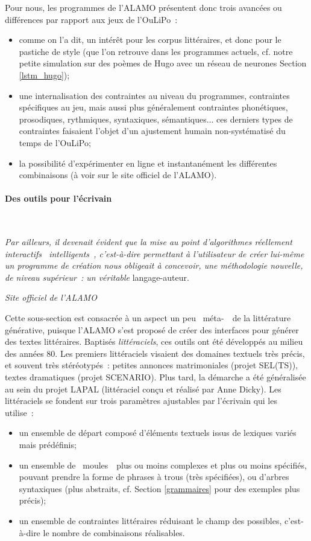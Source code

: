 \documentclass{article}
\newcommand{\subsubsubsection}[1]{\paragraph{#1}\mbox{}\\}
\newenvironment{citationbox}
{\begin{center}
		\begin{minipage}{.8\textwidth}
		}
		{
		\end{minipage}	
\end{center}
}
\begin{document}
					Pour nous, les programmes de l'ALAMO présentent donc trois avancées ou différences par rapport aux jeux de l'OuLiPo~:
					\vspace{2mm}
					\begin{itemize}
						\item comme on l'a dit, un intérêt pour les corpus littéraires, et donc pour le pastiche de style (que l'on retrouve dans les programmes actuels, cf. notre petite simulation sur des poèmes de Hugo avec un réseau de neurones Section \ref{lstm_hugo});
						\item une internalisation des contraintes au niveau du programmes, contraintes spécifiques au jeu, mais aussi plus généralement contraintes phonétiques, prosodiques, rythmiques, syntaxiques, sémantiques... ces derniers types de contraintes faisaient l'objet d'un ajustement humain non-systématisé du temps de l'OuLiPo;
						\item la possibilité d'expérimenter en ligne et instantanément les différentes combinaisons (à voir sur le site officiel de l'ALAMO).
					\end{itemize}
				\subsubsubsection{Des outils pour l'écrivain}
					\begin{citationbox}
						\textit{Par ailleurs, il devenait évident que la mise au point d'algorithmes réellement interactifs \guillemotleft~intelligents~\guillemotright, c’est-à-dire permettant à l’utilisateur de créer lui-même un programme de création nous obligeait à concevoir, une méthodologie nouvelle, de niveau supérieur~: un véritable} langage-auteur.
						\begin{flushright}
							\textit{Site officiel de l'ALAMO} \autocite{alamo}
						\end{flushright}
					\end{citationbox}
					Cette sous-section est consacrée à un aspect un peu \guillemotleft~méta-~\guillemotright~de la littérature générative, puisque l'ALAMO s'est proposé de créer des interfaces pour générer des textes littéraires. Baptisés \textit{littéraciels}, ces outils ont été développés au milieu des années 80. Les premiers littéraciels visaient des domaines textuels très précis, et souvent très stéréotypés~: petites annonces matrimoniales (projet SEL(TS)), textes dramatiques (projet SCENARIO). Plus tard, la démarche a été généralisée au sein du projet LAPAL (littéraciel conçu et réalisé par Anne Dicky). Les littéraciels se fondent sur trois paramètres ajustables par l'écrivain qui les utilise~:
					\vspace{2mm}
					\begin{itemize}
						\item un ensemble de départ composé d'éléments textuels issus de lexiques variés mais prédéfinis;
						\item un ensemble de \guillemotleft~moules~\guillemotright~plus ou moins complexes et plus ou moins spécifiés, pouvant prendre la forme de phrases à trous (très spécifiées), ou d'arbres syntaxiques (plus abstraits, cf. Section \ref{grammaires} pour des exemples plus précis);
						\item un ensemble de contraintes littéraires réduisant le champ des possibles, c'est-à-dire le nombre de combinaisons réalisables.
					\end{itemize}
\end{document}
